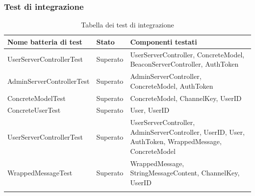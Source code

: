 		\subsubsection{Test di integrazione}
		\begin{longtable}{ p{} p{} p{} }			
			\toprule
			\textbf{Nome batteria di test} & \textbf{Stato} & \textbf{Componenti testati} \\
			\midrule
			UserServerControllerTest 	& Superato  & 	UserServerController,\newline{}
																	ConcreteModel,\newline{}
																	BeaconServerController,\newline{}
																	AuthToken \\
			AdminServerControllerTest 	& Superato 	& 	AdminServerController,\newline{}
																	ConcreteModel,\newline{}
																	AuthToken \\
			ConcreteModelTest 			& Superato 	& 	ConcreteModel,\newline{}
																	ChannelKey,\newline{}
																	UserID \\
			ConcreteUserTest 				& Superato 	& 	User,\newline{}
																	UserID \\
			UserServerControllerTest 	& Superato 	& 	UserServerController,\newline{}
																	AdminServerController,\newline{}
																	UserID,\newline{}
																	User,\newline{}
																	AuthToken,\newline{}
																	WrappedMessage,\newline{}
																	ConcreteModel \\
			WrappedMessageTest 			& Superato	&	WrappedMessage,\newline{}
																	StringMessageContent,\newline{}
																	ChannelKey,\newline{}
																	UserID \\

			\caption{Tabella dei test di integrazione}	
		\end{longtable}

